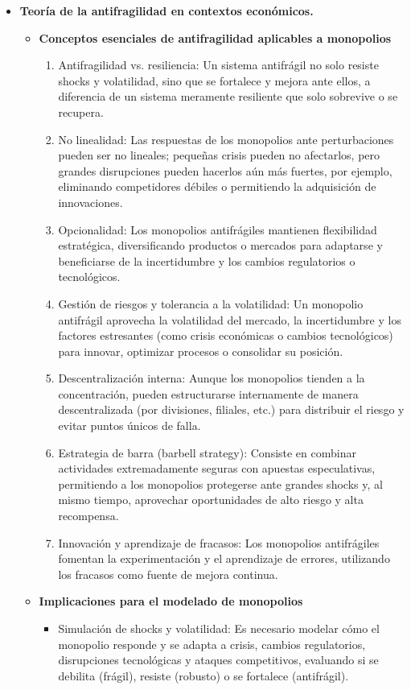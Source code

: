 \documentclass[a4paper,12pt]{article}
\begin{document}
\begin{itemize}
\begin{itemize}
        
        \item \textbf{Teoría de la antifragilidad en contextos económicos.}
        \begin{itemize}
    \item \textbf{Conceptos esenciales de antifragilidad aplicables a monopolios}
    \begin{enumerate}
        \item Antifragilidad vs. resiliencia: Un sistema antifrágil no solo resiste shocks y volatilidad, sino que se fortalece y mejora ante ellos, a diferencia de un sistema meramente resiliente que solo sobrevive o se recupera.

    \item No linealidad: Las respuestas de los monopolios ante perturbaciones pueden ser no lineales; pequeñas crisis pueden no afectarlos, pero grandes disrupciones pueden hacerlos aún más fuertes, por ejemplo, eliminando competidores débiles o permitiendo la adquisición de innovaciones.

    \item Opcionalidad: Los monopolios antifrágiles mantienen flexibilidad estratégica, diversificando productos o mercados para adaptarse y beneficiarse de la incertidumbre y los cambios regulatorios o tecnológicos.

    \item Gestión de riesgos y tolerancia a la volatilidad: Un monopolio antifrágil aprovecha la volatilidad del mercado, la incertidumbre y los factores estresantes (como crisis económicas o cambios tecnológicos) para innovar, optimizar procesos o consolidar su posición.

    \item Descentralización interna: Aunque los monopolios tienden a la concentración, pueden estructurarse internamente de manera descentralizada (por divisiones, filiales, etc.) para distribuir el riesgo y evitar puntos únicos de falla.

    \item Estrategia de barra (barbell strategy): Consiste en combinar actividades extremadamente seguras con apuestas especulativas, permitiendo a los monopolios protegerse ante grandes shocks y, al mismo tiempo, aprovechar oportunidades de alto riesgo y alta recompensa.

    \item Innovación y aprendizaje de fracasos: Los monopolios antifrágiles fomentan la experimentación y el aprendizaje de errores, utilizando los fracasos como fuente de mejora continua.    
    \end{enumerate}
    \item \textbf{Implicaciones para el modelado de monopolios}
    \begin{itemize}
        \item Simulación de shocks y volatilidad: Es necesario modelar cómo el monopolio responde y se adapta a crisis, cambios regulatorios, disrupciones tecnológicas y ataques competitivos, evaluando si se debilita (frágil), resiste (robusto) o se fortalece (antifrágil).


\end{itemize}
\end{itemize}
\end{itemize}
\end{itemize}
\end{document}
